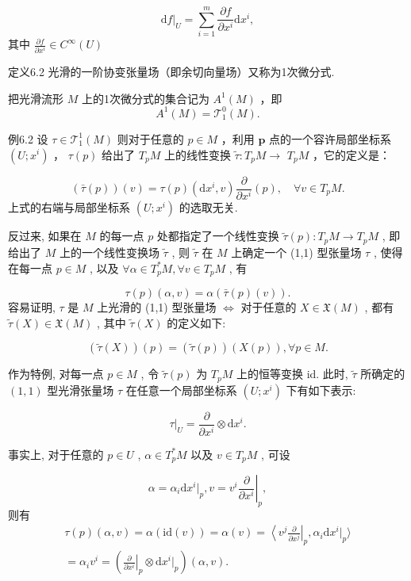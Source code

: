 $$
\mathrm {d} f | _ {U} = \sum_ {i = 1} ^ {m} \frac {\partial f}{\partial x ^ {i}} \mathrm {d} x ^ {i},
$$
其中  $\frac{\partial f}{\partial x^i} \in C^\infty(U)$

定义6.2 光滑的一阶协变张量场（即余切向量场）又称为1次微分式.

把光滑流形  $M$  上的1次微分式的集合记为  $A^1 (M)$  ，即
$$
A ^ {1} (M) = \mathcal {T} _ {1} ^ {0} (M).
$$

例6.2 设  $\tau \in \mathcal{T}_1^1 (M)$  则对于任意的  $p\in M$  ，利用  $\pmb{p}$  点的一个容许局部坐标系  $(U;x^{i})$  ，  $\tau (p)$  给出了  $T_{p}M$  上的线性变换  $\tilde{\tau}:T_pM\to$ $T_{p}M$  ，它的定义是：

$$
(\bar {\tau} (p)) (v) = \tau (p) \left(\mathrm {d} x ^ {i}, v\right) \frac {\partial}{\partial x ^ {i}} (p), \quad \forall v \in T _ {p} M. %
$$
上式的右端与局部坐标系  $(U; x^i)$  的选取无关.

反过来, 如果在  $M$  的每一点  $p$  处都指定了一个线性变换  $\tilde{\tau}(p): T_pM \to T_pM$ , 即给出了  $M$  上的一个线性变换场  $\tilde{\tau}$ , 则  $\tilde{\tau}$  在  $M$  上确定一个 (1,1) 型张量场  $\tau$ , 使得在每一点  $p \in M$ , 以及  $\forall \alpha \in T_p^*M, \forall v \in T_pM$ , 有

$$
\tau (p) (\alpha , v) = \alpha (\bar {\tau} (p) (v)).
$$
容易证明,  $\tau$  是  $M$  上光滑的 (1,1) 型张量场  $\Longleftrightarrow$  对于任意的  $X \in \mathfrak{X}(M)$ , 都有  $\tilde{\tau}(X) \in \mathfrak{X}(M)$ , 其中  $\tilde{\tau}(X)$  的定义如下:

$$
(\tilde {\tau} (X)) (p) = (\tilde {\tau} (p)) (X (p)), \forall p \in M.
$$

作为特例, 对每一点  $p \in M$ , 令  $\tilde{\tau}(p)$  为  $T_pM$  上的恒等变换 id. 此时,  $\tilde{\tau}$  所确定的  $(1,1)$  型光滑张量场  $\tau$  在任意一个局部坐标系  $(U; x^i)$  下有如下表示:

$$
\tau | _ {U} = \frac {\partial}{\partial x ^ {i}} \otimes \mathrm {d} x ^ {i}.
$$

事实上, 对于任意的  $p \in U$ ,  $\alpha \in T_p^* M$  以及  $v \in T_p M$ , 可设

$$
\alpha = \alpha_ {i} \mathrm {d} x ^ {i} | _ {p}, v = v ^ {i} \left. \frac {\partial}{\partial x ^ {i}} \right| _ {p},
$$
则有
$$
\begin{array}{l} \tau (p) (\alpha , v) = \alpha (\mathrm {i d} (v)) = \alpha (v) = \left\langle v ^ {j} \frac {\partial}{\partial x ^ {j}} \right| _ {p}, \alpha_ {i} \mathrm {d} x ^ {i} | _ {p} \Bigg \rangle \\ = \alpha_ {i} v ^ {i} = \left(\left. \frac {\partial}{\partial x ^ {i}} \right| _ {p} \otimes \mathrm {d} x ^ {i} | _ {p}\right) (\alpha , v). \\ \end{array}
$$

